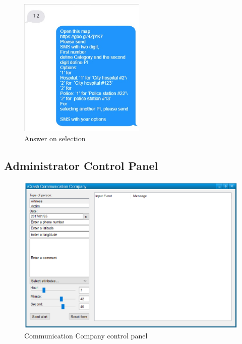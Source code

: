 \begin{figure}
  \centering
    \includegraphics[width=6cm]{images/mockups/feature3-PI/iCrashRequest.eps}
  \caption{Answer on selection}
  \label{fig:Answeronselection}
\end{figure}

\subsection{Administrator Control Panel}

\begin{figure}
  \centering
    \includegraphics[width=12cm]{images/mockups/feature2-access-rights/CommunicationCompany.eps}
  \caption{Communication Company control panel}
  \label{fig:CommunicationCompanyControlPanel}
\end{figure}
